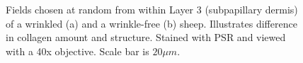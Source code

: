 %

\begin{figure}[!h]
\centering
\captionsetup{width=0.92\textwidth}
  \caption{Fields chosen at random from within Layer 3 (subpapillary dermis) of a wrinkled (a) and a wrinkle-free (b) sheep. Illustrates difference in collagen amount and structure. Stained with PSR and viewed with a 40x objective. Scale bar is $20\mu m$.}
\vfill
  \label{fig:psr40x}
\end{figure}

%


